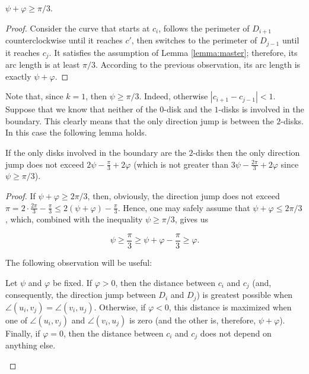 \begin{enumerate}[label={\bf Case \arabic*: }, wide, labelwidth=!, labelindent=0pt]
\begin{observation}
$\psi + \varphi\geq \pi/3$.
\end{observation}

\begin{proof}
Consider the curve that starts at $c_i$, follows the perimeter of $D_{i+1}$ counterclockwise until it reaches $c'$, then switches to the perimeter of $D_{j-1}$ until it reaches $c_j$. It satisfies the assumption of Lemma \ref{lemma:master}; therefore, its arc length is at least $\pi/3$. According to the previous observation, its arc length is exactly $\psi + \varphi$.
\end{proof}


Note that, since $k = 1$, then $\psi\geq\pi/3$. Indeed, otherwise $|c_{i+1} - c_{j-1}| < 1$. Suppose that we know that neither of the $0$-disk and the $1$-disks is involved in the boundary. This clearly means that the only direction jump is between the $2$-disks. In this case the following lemma holds.

\begin{lemma}
If the only disks involved in the boundary are the $2$-disks then the only direction jump does not exceed $2\psi - \frac{\pi}{3} + 2\varphi$ (which is not greater than $3\psi - \frac{2\pi}{3} + 2\varphi$ since $\psi\geq\pi/3$).
\end{lemma}

\begin{proof}
If $\psi + \varphi\geq 2\pi/3$, then, obviously, the direction jump does not exceed $\pi = 2\cdot\frac{2\pi}{3} - \frac{\pi}{3}\leq 2(\psi + \varphi) - \frac{\pi}{3}$. Hence, one may safely assume that $\psi + \varphi\leq 2\pi/3$, which, combined with the inequality $\psi\geq\pi/3$, gives us

\begin{equation}
\label{eq:straighten}
\psi \geq \frac{\pi}{3}\geq \psi + \varphi - \frac{\pi}{3}\geq \varphi.\tag{$\star$}
\end{equation}

The following observation will be useful:

\begin{observation}
Let $\psi$ and $\varphi$ be fixed. If $\varphi > 0$, then the distance between $c_i$ and $c_j$ (and, consequently, the direction jump between $D_i$ and $D_j$) is greatest possible when $\angle(u_i, v_j) = \angle(v_i, u_j)$. Otherwise, if $\varphi < 0$, this distance is maximized when one of $\angle(u_i, v_j)$ and $\angle(v_i, u_j)$ is zero (and the other is, therefore, $\psi + \varphi$). Finally, if $\varphi = 0$, then the distance between $c_i$ and $c_j$ does not depend on anything else.
\end{observation}


\end{proof}
\end{enumerate}
